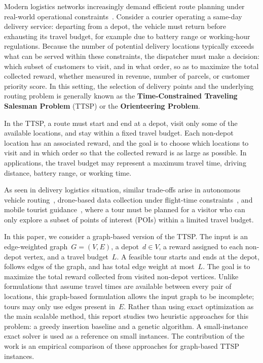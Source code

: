 \documentclass[report,english,cleveref,autoref,a4paper]{lipics-v2021}
\begin{document}
Modern logistics networks increasingly demand efficient route planning
under real-world operational constraints~\cite{GRAZIASPERANZA2018830}. Consider a courier operating
a same-day delivery service: departing from a depot, the vehicle
must return before exhausting its travel budget, for example due to battery
range or working-hour regulations. Because the number of
potential delivery locations typically exceeds what can be served within
these constraints, the dispatcher must make a decision: which
subset of customers to visit, and in what order, so as to maximize the
total collected reward, whether measured in revenue, number of parcels,
or customer priority score. In this setting, the selection of delivery points
and the underlying routing problem is generally known as the
\textbf{Time-Constrained Traveling Salesman Problem} (TTSP) or the
\textbf{Orienteering Problem}. 

In the TTSP, a route must start and end at a
depot, visit only some of the available locations, and stay within a fixed travel
budget. Each non-depot location has an associated reward, and the goal is to
choose which locations to visit and in which order so that the collected reward
is as large as possible. In applications, the travel budget may represent a
maximum travel time, driving distance, battery range, or working time.

As seen in delivery logistics situation, similar
trade-offs arise in autonomous vehicle routing~\cite{Karakostas2024}, drone-based data collection under flight-time constraints~\cite{Gaertner2022}, and mobile tourist guidance~\cite{Vansteenwegen2007},
where a tour must be planned for a visitor who can only explore a subset
of points of interest (POIs) within a limited travel budget.

In this paper, we consider a graph-based version of the TTSP. The input is an
edge-weighted graph~$G=(V,E)$, a depot~$d \in V$, a reward assigned to each
non-depot vertex, and a travel budget~$L$. A feasible tour starts and ends at
the depot, follows edges of the graph, and has total edge weight at most~$L$.
The goal is to maximize the total reward collected from visited non-depot
vertices. Unlike formulations that assume travel times are available between
every pair of locations, this graph-based formulation allows the input graph to
be incomplete; tours may only use edges present in~$E$. Rather than using exact
optimization as the main scalable method, this report studies two heuristic
approaches for this problem: a greedy insertion baseline and a genetic
algorithm. A small-instance exact solver is used as a reference on small
instances. The contribution of the work is an empirical comparison of these
approaches for graph-based TTSP instances.
\end{document}
